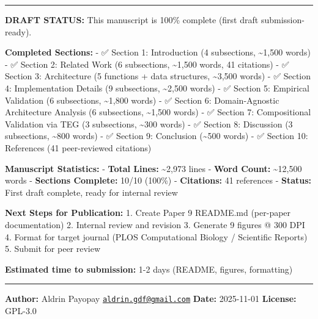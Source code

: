\documentclass[
]{article}
\begin{document}
\begin{center}\rule{0.5\linewidth}{0.5pt}\end{center}

\textbf{DRAFT STATUS:} This manuscript is 100\% complete (first draft
submission-ready).

\textbf{Completed Sections:} - ✅ Section 1: Introduction (4
subsections, \textasciitilde1,500 words) - ✅ Section 2: Related Work (6
subsections, \textasciitilde1,500 words, 41 citations) - ✅ Section 3:
Architecture (5 functions + data structures, \textasciitilde3,500 words)
- ✅ Section 4: Implementation Details (9 subsections,
\textasciitilde2,500 words) - ✅ Section 5: Empirical Validation (6
subsections, \textasciitilde1,800 words) - ✅ Section 6: Domain-Agnostic
Architecture Analysis (6 subsections, \textasciitilde1,500 words) - ✅
Section 7: Compositional Validation via TEG (3 subsections,
\textasciitilde300 words) - ✅ Section 8: Discussion (3 subsections,
\textasciitilde800 words) - ✅ Section 9: Conclusion (\textasciitilde500
words) - ✅ Section 10: References (41 peer-reviewed citations)

\textbf{Manuscript Statistics:} - \textbf{Total Lines:}
\textasciitilde2,973 lines - \textbf{Word Count:} \textasciitilde12,500
words - \textbf{Sections Complete:} 10/10 (100\%) - \textbf{Citations:}
41 references - \textbf{Status:} First draft complete, ready for
internal review

\textbf{Next Steps for Publication:} 1. Create Paper 9 README.md
(per-paper documentation) 2. Internal review and revision 3. Generate 9
figures @ 300 DPI 4. Format for target journal (PLOS Computational
Biology / Scientific Reports) 5. Submit for peer review

\textbf{Estimated time to submission:} 1-2 days (README, figures,
formatting)

\begin{center}\rule{0.5\linewidth}{0.5pt}\end{center}

\textbf{Author:} Aldrin Payopay
\href{mailto:aldrin.gdf@gmail.com}{\nolinkurl{aldrin.gdf@gmail.com}}
\textbf{Date:} 2025-11-01 \textbf{License:} GPL-3.0
\end{document}
